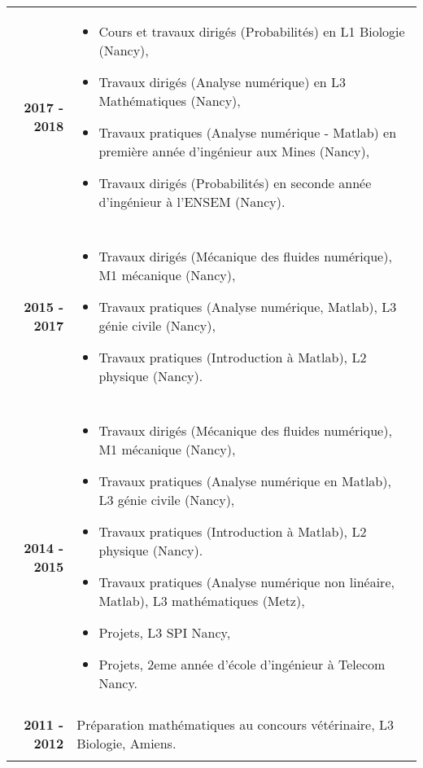 \documentclass[10pt,a4paper]{report}
\begin{document}
\noindent
\begin{center}
\begin{tabular}{r p{12cm}}
\textbf{2017 - 2018} & \begin{itemize}
\item Cours et travaux dirigés (Probabilités) en L1 Biologie (Nancy),
\item Travaux dirigés (Analyse numérique) en L3 Mathématiques (Nancy),
\item Travaux pratiques (Analyse numérique - Matlab) en première année d'ingénieur aux Mines (Nancy),
\item Travaux dirigés (Probabilités) en seconde année d'ingénieur à l'ENSEM (Nancy).
\end{itemize}\\

& \\

\textbf{2015 - 2017} & \begin{itemize}
\item Travaux dirigés (Mécanique des fluides numérique), M1 mécanique (Nancy),
\item Travaux pratiques (Analyse numérique, Matlab), L3 génie civile (Nancy),
\item Travaux pratiques (Introduction à Matlab), L2 physique (Nancy).
\end{itemize}\\

& \\

\textbf{2014 - 2015} & \begin{itemize}
\item Travaux dirigés (Mécanique des fluides numérique), M1 mécanique (Nancy),
\item Travaux pratiques (Analyse numérique en Matlab), L3 génie civile (Nancy),
\item Travaux pratiques (Introduction à Matlab), L2 physique (Nancy).
\item Travaux pratiques (Analyse numérique non linéaire, Matlab), L3 mathématiques (Metz),
\item Projets, L3 SPI Nancy,
\item Projets, 2eme année d'école d'ingénieur à Telecom Nancy.
\end{itemize}\\

& \\

\textbf{2011 - 2012} & Préparation mathématiques au concours vétérinaire, L3 Biologie, Amiens.\\

& \\
\end{tabular}
\end{center}
\end{document}
